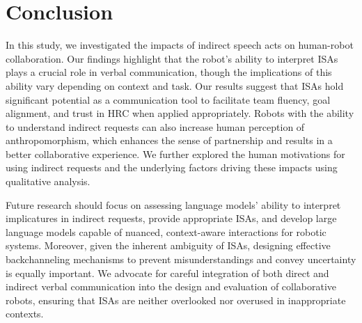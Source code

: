 \section{Conclusion}
In this study, we investigated the impacts of indirect speech acts on human-robot collaboration. Our findings highlight that the robot's ability to interpret ISAs plays a crucial role in verbal communication, though the implications of this ability vary depending on context and task. Our results suggest that ISAs hold significant potential as a communication tool to facilitate team fluency, goal alignment, and trust in HRC when applied appropriately. Robots with the ability to understand indirect requests can also increase human perception of anthropomorphism, which enhances the sense of partnership and results in a better collaborative experience. We further explored the human motivations for using indirect requests and the underlying factors driving these impacts using qualitative analysis.  

Future research should focus on assessing language models' ability to interpret implicatures in indirect requests, provide appropriate ISAs, and develop large language models capable of nuanced, context-aware interactions for robotic systems. Moreover, given the inherent ambiguity of ISAs, designing effective backchanneling mechanisms to prevent misunderstandings and convey uncertainty is equally important. We advocate for careful integration of both direct and indirect verbal communication into the design and evaluation of collaborative robots, ensuring that ISAs are neither overlooked nor overused in inappropriate contexts.
